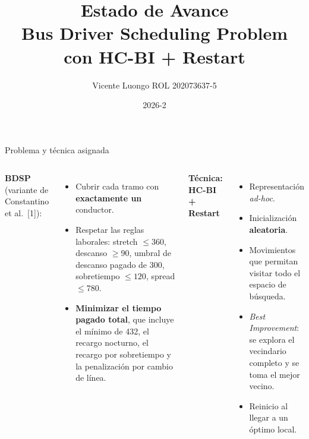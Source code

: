 \documentclass[aspectratio=169,10pt]{beamer}
\title{Estado de Avance\\\large Bus Driver Scheduling Problem con HC-BI + Restart}
\author{Vicente Luongo \quad ROL 202073637-5}
\institute{INF295 Inteligencia Artificial -- UTFSM}
\date{2026-2}
\begin{document}
\begin{frame}
\titlepage
\end{frame}

\begin{frame}{Problema y técnica asignada}
\begin{columns}[T]
\textbf{BDSP} (variante de Constantino et al.~[1]):
\begin{itemize}
\item Cubrir cada tramo con \textbf{exactamente un} conductor.
\item Respetar las reglas laborales: stretch $\le 360$, descanso $\ge 90$, umbral de descanso pagado de 300, sobretiempo $\le 120$, spread $\le 780$.
\item \textbf{Minimizar el tiempo pagado total}, que incluye el mínimo de 432, el recargo nocturno, el recargo por sobretiempo y la penalización por cambio de línea.
\end{itemize}
\textbf{Técnica: HC-BI + Restart}
\begin{itemize}
\item Representación \emph{ad-hoc}.
\item Inicialización \textbf{aleatoria}.
\item Movimientos que permitan visitar todo el espacio de búsqueda.
\item \emph{Best Improvement}: se explora el vecindario completo y se toma el mejor vecino.
\item Reinicio al llegar a un óptimo local.
\end{itemize}
\end{columns}
\end{frame}
\end{document}

